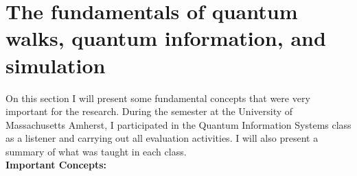 \documentclass{article}
\begin{document}
        


\section{The fundamentals of quantum walks, quantum information, and simulation}
    On this section I will present some fundamental concepts that were very important for the research. During the semester at the University of Massachusetts Amherst, I participated in the Quantum Information Systems class as a listener and carrying out all evaluation activities. I will also present a summary of what was taught in each class.\\
    
    \textbf{Important Concepts:}\\
    
\end{document}
